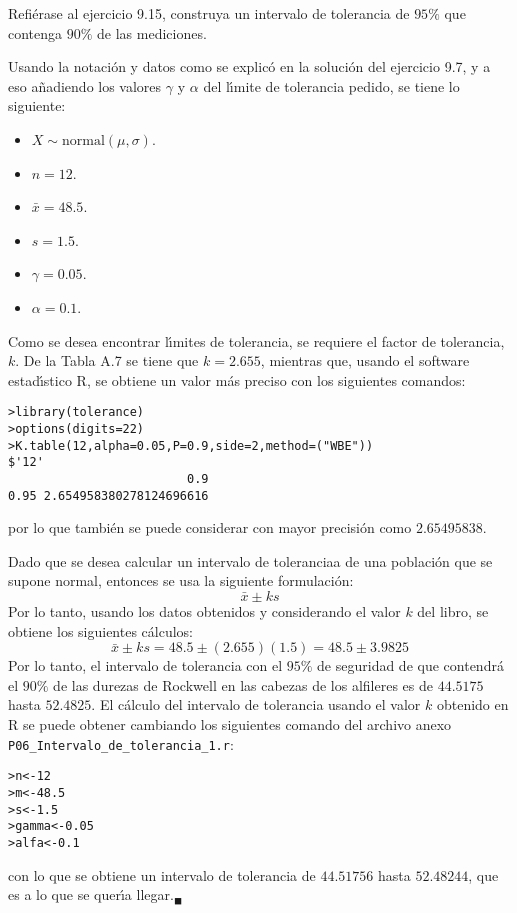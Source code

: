 \begin{enunciado}
 Refi\'erase al ejercicio 9.15, construya un intervalo de tolerancia de $95\%$ que contenga $90\%$ de las mediciones.
\end{enunciado}

\begin{solucion}
 Usando la notaci\'on y datos como se explic\'o en la soluci\'on del ejercicio 9.7, y a eso a\~nadiendo los valores $\gamma$ y $\alpha$ del l\'{\i}mite de tolerancia pedido, se tiene lo siguiente:
 \begin{itemize}
  \item $X\sim\text{normal}(\mu,\sigma)$.
  \item $n=12$.
  \item $\bar{x}=48.5$.
  \item $s=1.5$.
  \item $\gamma=0.05$.
  \item $\alpha=0.1$.
 \end{itemize}
 Como se desea encontrar l\'{\i}mites de tolerancia, se requiere el factor de tolerancia, $k$. De la Tabla A.7 se tiene que $k=2.655$, mientras que, usando el software estad\'{\i}stico R, se obtiene un valor m\'as preciso con los siguientes comandos:
 \begin{verbatim}
>library(tolerance)
>options(digits=22)
>K.table(12,alpha=0.05,P=0.9,side=2,method=("WBE"))
$'12'
                         0.9
0.95 2.654958380278124696616
 \end{verbatim}
 \vspace{-0.5cm}
 por lo que tambi\'en se puede considerar con mayor precisi\'on como $2.65495838$.
 \par
 Dado que se desea calcular un intervalo de toleranciaa de una poblaci\'on que se supone normal, entonces se usa la siguiente formulaci\'on:
 \begin{equation*}
  \bar{x}\pm ks
 \end{equation*}
 Por lo tanto, usando los datos obtenidos y considerando el valor $k$ del libro, se obtiene los siguientes c\'alculos:
 \begin{equation*}
  \bar{x}\pm ks = 48.5 \pm (2.655)(1.5) = 48.5 \pm 3.9825
 \end{equation*}
 Por lo tanto, el intervalo de tolerancia con el $95\%$ de seguridad de que contendr\'a el $90\%$ de las durezas de Rockwell en las cabezas de los alfileres es de $44.5175$ hasta $52.4825$. El c\'alculo del intervalo de tolerancia usando el valor $k$ obtenido en R se puede obtener cambiando los siguientes comando del archivo anexo \texttt{P06\_Intervalo\_de\_tolerancia\_1.r}:
 \begin{verbatim}
>n<-12
>m<-48.5
>s<-1.5
>gamma<-0.05
>alfa<-0.1
 \end{verbatim}
 \vspace{-0.5cm}
 con lo que se obtiene un intervalo de tolerancia de $44.51756$ hasta $52.48244$, que es a lo que se quer\'{\i}a llegar.${}_{\blacksquare}$
\end{solucion}
